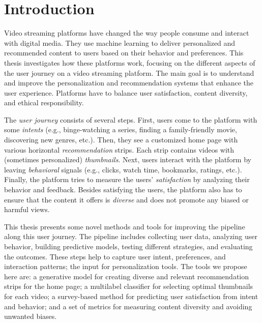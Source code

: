 
\chapter{Introduction}
\label{chapter:introduction}


Video streaming platforms have changed the way people consume and interact with digital media. They use machine learning to deliver personalized and recommended content to users based on their behavior and preferences. This thesis investigates how these platforms work, focusing on the different aspects of the user journey on a video streaming platform. The main goal is to understand and improve the personalization and recommendation systems that enhance the user experience. Platforms have to balance user satisfaction, content diversity, and ethical responsibility.

The \emph{user journey} consists of several steps. First, users come to the platform with some \emph{intents} (e.g., binge-watching a series, finding a family-friendly movie, discovering new genres, etc.). Then, they see a customized home page with various horizontal \emph{recommendation} strips. Each strip contains videos with (sometimes personalized) \emph{thumbnails}. Next, users interact with the platform by leaving \emph{behavioral} signals (e.g., clicks, watch time, bookmarks, ratings, etc.). Finally, the platform tries to measure the users’ \emph{satisfaction} by analyzing their behavior and feedback. Besides satisfying the users, the platform also has to ensure that the content it offers is \emph{diverse} and does not promote any biased or harmful views.

This thesis presents some novel methods and tools for improving the pipeline along this user journey. The pipeline includes collecting user data, analyzing user behavior, building predictive models, testing different strategies, and evaluating the outcomes. These steps help to capture user intent, preferences, and interaction patterns; the input for personalization tools. The tools we propose here are: a generative model for creating diverse and relevant recommendation strips for the home page; a multilabel classifier for selecting optimal thumbnails for each video; a survey-based method for predicting user satisfaction from intent and behavior; and a set of metrics for measuring content diversity and avoiding unwanted biases.

